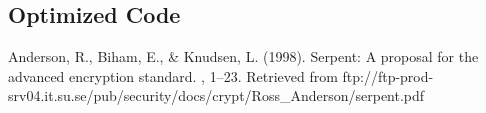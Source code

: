 \documentclass[12pt]{article} %
\begin{document}
\subsection{Optimized Code}


\begin{thebibliography}{99} %

Anderson, R., Biham, E., \& Knudsen, L. (1998).
\newblock Serpent: A proposal for the advanced encryption standard.
, 1–23. Retrieved from ftp://ftp-prod-srv04.it.su.se/pub/security/docs/crypt/Ross\_Anderson/serpent.pdf

\end{thebibliography}

\end{document}
